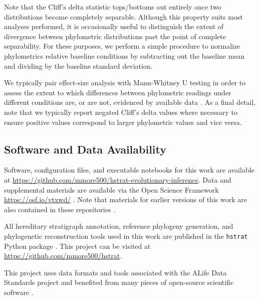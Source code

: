 Note that the Cliff's delta statistic tops/bottoms out entirely once two distributions become completely separable.
Although this property suits most analyses performed, it is occasionally useful to distinguish the extent of divergence between phylometric distributions past the point of complete separability.
For these purposes, we perform a simple procedure to normalize phylometrics relative baseline conditions by subtracting out the baseline mean and dividing by the baseline standard deviation.

We typically pair effect-size analysis with Mann-Whitney U testing in order to assess the extent to which differences between phylometric readings under different conditions are, or are not, evidenced by available data \citep{mann1947on}.
As a final detail, note that we typically report negated Cliff's delta values where necessary to ensure positive values correspond to larger phylometric values and vice versa.

\subsection{Software and Data Availability}

Software, configuration files, and executable notebooks for this work are available at \url{https://github.com/mmore500/hstrat-evolutionary-inference}.
Data and supplemental materials are available via the Open Science Framework \url{https://osf.io/vtxwd/} \citep{foster2017open}.
Note that materials for earlier versions of this work are also contained in these repositories \citep{moreno2023toward}.

All hereditary stratigraph annotation, reference phylogeny generation, and phylogenetic reconstruction tools used in this work are published in the \texttt{hstrat} Python package \citep{moreno2022hstrat}.
This project can be visited at \url{https://github.com/mmore500/hstrat}.

This project uses data formats and tools associated with the ALife Data Standards project \citep{lalejini2019data} and benefited from many pieces of open-source scientific software \citep{ofria2020empirical,sand2014tqdist,2020SciPy-NMeth,harris2020array,reback2020pandas,mckinney-proc-scipy-2010,sukumaran2010dendropy,cock2009biopython,dolson2024phylotrackpy,torchiano2016effsize,waskom2021seaborn,hunter2007matplotlib,moreno2024apc,moreno2024qspool,moreno2023teeplot,hagen2021gen3sis,ofria2004avida,torchiano2016effsize}.